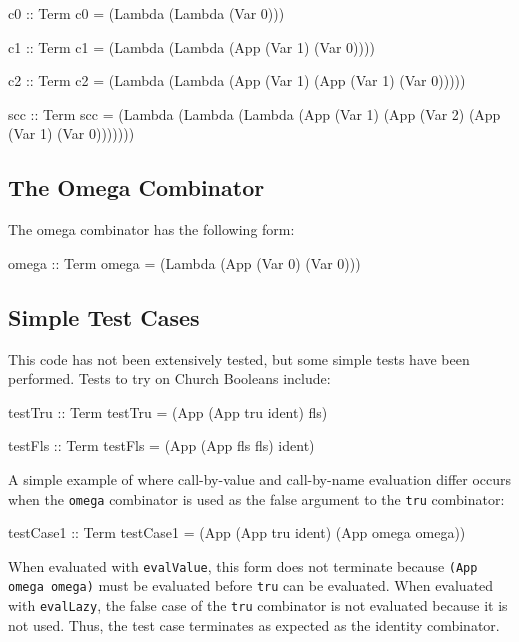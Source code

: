 \documentclass[10pt]{article}
\begin{document}
\begin{code}
  c0 :: Term
  c0 = (Lambda (Lambda (Var 0)))

  c1 :: Term
  c1 = (Lambda (Lambda (App (Var 1) (Var 0))))

  c2 :: Term
  c2 = (Lambda (Lambda (App (Var 1) (App (Var 1) (Var 0)))))

  scc :: Term
  scc = (Lambda
         (Lambda
          (Lambda (App (Var 1)
                   (App (Var 2)
                    (App (Var 1) (Var 0)))))))
\end{code}

\subsection{The Omega Combinator}

The omega combinator has the following form:

\begin{code}
  omega :: Term
  omega = (Lambda (App (Var 0) (Var 0)))
\end{code}

\subsection{Simple Test Cases}

This code has not been extensively tested, but some simple tests have
been performed.  Tests to try on Church Booleans include:

\begin{code}
  testTru :: Term
  testTru = (App (App tru ident) fls)

  testFls :: Term
  testFls = (App (App fls fls) ident)
\end{code}

A simple example of where call-by-value and call-by-name evaluation
differ occurs when the \texttt{omega} combinator is used as the false
argument to the \texttt{tru} combinator:

\begin{code}
  testCase1 :: Term
  testCase1 = (App (App tru ident) (App omega omega))
\end{code}

When evaluated with \texttt{evalValue}, this form does not terminate
because \texttt{(App omega omega)} must be evaluated before
\texttt{tru} can be evaluated.  When evaluated with \texttt{evalLazy},
the false case of the \texttt{tru} combinator is not evaluated because
it is not used.  Thus, the test case terminates as expected as the
identity combinator.


\end{document}
